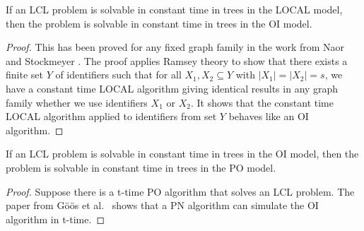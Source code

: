 \begin{lemma} \label{lem:algorithm:from_pn_to_local:o1_local_trees_imply_o1_oi_trees}
    If an LCL problem is solvable in constant time in trees in the LOCAL model, then the problem is solvable in constant time in trees in the OI model.
\end{lemma}
\begin{proof}
    This has been proved for any fixed graph family in the work from Naor and Stockmeyer \cite[theorem 3.3]{DBLP:journals/siamcomp/NaorS95}.
    The proof applies Ramsey theory to show that there exists a finite set $Y$ of identifiers such that for all $X_1, X_2 \subseteq Y$ with $|X_1| = |X_2| = s$, we have a constant time LOCAL algorithm giving identical results in any graph family whether we use identifiers $X_1$ or $X_2$.
    It shows that the constant time LOCAL algorithm applied to identifiers from set $Y$ behaves like an OI algorithm.
\end{proof}



\begin{lemma} \label{lem:algorithm:from_pn_to_local:o1_oi_trees_imply_o1_pn_trees}
    If an LCL problem is solvable in constant time in trees in the OI model, then the problem is solvable in constant time in trees in the PO model.
\end{lemma}
\begin{proof}
    Suppose there is a t-time PO algorithm that solves an LCL problem.
    The paper from Göös et al.~\cite{DBLP:journals/dc/GoosHS17} shows that a PN algorithm can simulate the OI algorithm in t-time.
\end{proof}




